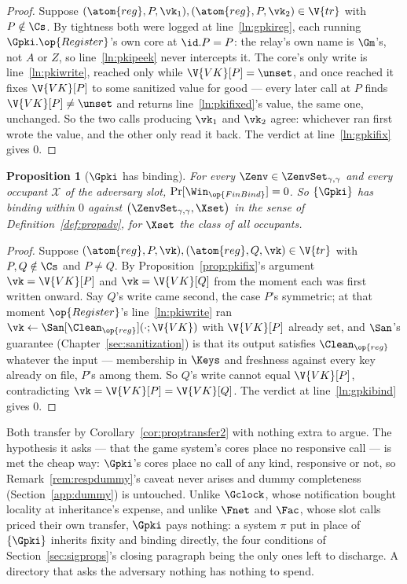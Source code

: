\documentclass[10pt,oneside,openany]{book}
\theoremstyle{accentdef}
\theoremstyle{accentplain}
\newtheorem{proposition}[definition]{Proposition}
\begin{document}
\begin{proof}
Suppose $(\atom{reg},P,\vk_1),(\atom{reg},P,\vk_2) \in \V{tr}$ with $P \notin \Cs$. By tightness both
were logged at line~\ref{ln:gpkireg}, each running $\Gpki.\op{Register}$'s own core at $\id.P = P$:
the relay's own name is $\Gm$'s, not $A$ or $Z$, so line~\ref{ln:pkipeek} never intercepts it. The
core's only write is line~\ref{ln:pkiwrite}, reached only while $\V{VK}[P] = \unset$, and once
reached it fixes $\V{VK}[P]$ to some sanitized value for good --- every later call at $P$ finds
$\V{VK}[P] \neq \unset$ and returns line~\ref{ln:pkifixed}'s value, the same one, unchanged. So the
two calls producing $\vk_1$ and $\vk_2$ agree: whichever ran first wrote the value, and the other
only read it back. The verdict at line~\ref{ln:gpkifix} gives $0$.
\end{proof}

\begin{proposition}[$\Gpki$ has binding]\label{prop:pkibind}
For every $\Zenv \in \ZenvSet_{\gamma,\gamma}$ and every occupant $\mathcal{X}$ of the adversary
slot, $\Pr[\Win_{\op{FinBind}}] = 0$. So $\{\Gpki\}$ has binding within $0$ against
$\bigl(\ZenvSet_{\gamma,\gamma},\Xset\bigr)$ in the sense of Definition~\ref{def:propadv}, for
$\Xset$ the class of all occupants.
\end{proposition}

\begin{proof}
Suppose $(\atom{reg},P,\vk),(\atom{reg},Q,\vk) \in \V{tr}$ with $P,Q \notin \Cs$ and $P \neq Q$. By
Proposition~\ref{prop:pkifix}'s argument $\vk = \V{VK}[P]$ and $\vk = \V{VK}[Q]$ from the moment
each was first written onward. Say $Q$'s write came second, the case $P$'s symmetric; at that
moment $\op{Register}$'s line~\ref{ln:pkiwrite} ran $\vk \gets \San[\Clean_{\op{reg}}](\cdot;\V{VK})$ with $\V{VK}[P]$
already set, and $\San$'s guarantee (Chapter~\ref{sec:sanitization}) is that its output satisfies
$\Clean_{\op{reg}}$ whatever the input --- membership in $\Keys$ and freshness against every key
already on file, $P$'s among them. So $Q$'s write cannot equal $\V{VK}[P]$, contradicting
$\vk = \V{VK}[P] = \V{VK}[Q]$. The verdict at line~\ref{ln:gpkibind} gives $0$.
\end{proof}

Both transfer by Corollary~\ref{cor:proptransfer2} with nothing extra to argue. The hypothesis it
asks --- that the game system's cores place no responsive call --- is met the cheap way: $\Gpki$'s
cores place no call of any kind, responsive or not, so Remark~\ref{rem:respdummy}'s caveat never
arises and dummy completeness (Section~\ref{app:dummy}) is untouched. Unlike $\Gclock$, whose
notification bought locality at inheritance's expense, and unlike $\Fnet$ and $\Fac$, whose slot
calls priced their own transfer, $\Gpki$ pays nothing: a system $\pi$ put in place of $\{\Gpki\}$
inherits fixity and binding directly, the four conditions of Section~\ref{sec:sigprops}'s closing
paragraph being the only ones left to discharge. A directory that asks the adversary nothing has
nothing to spend.
\end{document}
